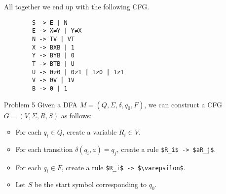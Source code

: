 \documentclass[12pt,letterpaper]{article}
\begin{document}
\begin{enumerate}
      All together we end up with the following CFG.

      \begin{lstlisting}
        S -> E | N
        E -> X≠Y | Y≠X
        N -> TV | VT
        X -> BXB | 1
        Y -> BYB | 0
        T -> BTB | U
        U -> 0≠0 | 0≠1 | 1≠0 | 1≠1
        V -> 0V | 1V
        B -> 0 | 1
      \end{lstlisting}

    \item[Problem 5]
      Given a DFA $M = (Q, \Sigma, \delta, q_0, F)$, we can construct a CFG $G = (V, \Sigma, R, S)$ as follows:

      \begin{itemize}
        \item For each $q_i \in Q$, create a variable $R_i \in V$.
        \item For each transition $\delta(q_i, a) = q_j$, create a rule \lstinline[mathescape]{$R_i$ -> $aR_j$}.
        \item For each $q_i \in F$, create a rule \lstinline[mathescape]{$R_i$ -> $\varepsilon$}.
        \item Let $S$ be the start symbol corresponding to $q_0$.
      \end{itemize}

  \end{enumerate}
\end{document}
